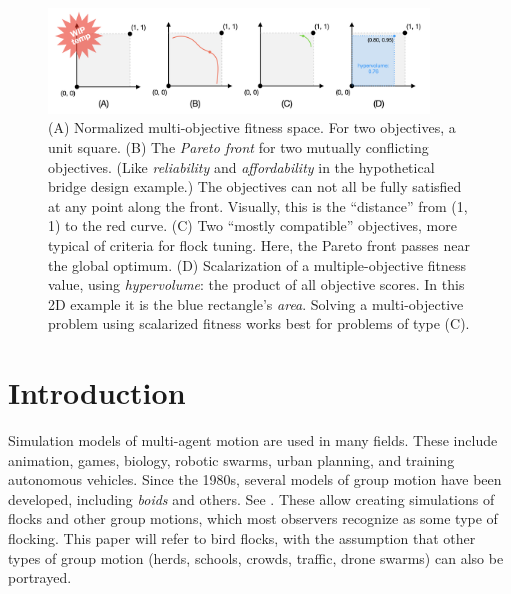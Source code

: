 \documentclass[letterpaper]{article}
\begin{document}


\begin{figure}[t]
    \centering
    \includegraphics[width=0.9\textwidth]{images/temp_MOF_HV.png}
    \caption{(A) Normalized multi-objective fitness space. For two objectives, a unit square. (B) The \textit{Pareto front} for two mutually conflicting objectives. (Like \textit{reliability} and \textit{affordability} in the hypothetical bridge design example.) The objectives can not all be fully satisfied at any point along the front. Visually, this is the ``distance'' from (1, 1) to the red curve. (C) Two ``mostly compatible'' objectives, more typical of criteria for flock tuning. Here, the Pareto front passes near the global optimum. (D) Scalarization of a multiple-objective fitness value, using \textit{hypervolume}: the product of all objective scores. In this 2D example it is the blue rectangle's \textit{area}. Solving a multi-objective problem using scalarized fitness works best for problems of type (C).}
    \label{fig:MOF_HV}
\end{figure}


\section{Introduction}
\label{sec:intro}

Simulation models of multi-agent motion are used in many fields. These include animation, games, biology, robotic swarms, urban planning, and training autonomous vehicles. Since the 1980s, several models of group motion have been developed, including \textit{boids} and others. See . These allow creating simulations of flocks and other group motions, which most observers recognize as some type of flocking. This paper will refer to bird flocks, with the assumption that other types of group motion (herds, schools, crowds, traffic, drone swarms) can also be portrayed.
\end{document}
